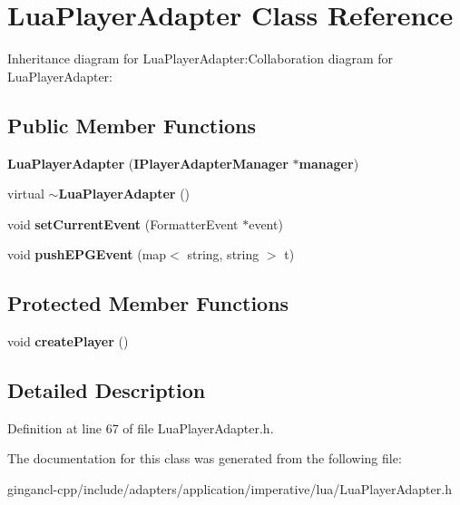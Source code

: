 \section{LuaPlayerAdapter Class Reference}
\label{classbr_1_1pucrio_1_1telemidia_1_1ginga_1_1ncl_1_1adapters_1_1application_1_1lua_1_1LuaPlayerAdapter}
Inheritance diagram for LuaPlayerAdapter:Collaboration diagram for LuaPlayerAdapter:\subsection*{Public Member Functions}
\begin{CompactItemize}
\item 
\textbf{LuaPlayerAdapter} ({\bf IPlayerAdapterManager} $\ast${\bf manager})\label{classbr_1_1pucrio_1_1telemidia_1_1ginga_1_1ncl_1_1adapters_1_1application_1_1lua_1_1LuaPlayerAdapter_b66133ab035f2930d5880e49c8e899be}

\item 
virtual {\bf $\sim$LuaPlayerAdapter} ()\label{classbr_1_1pucrio_1_1telemidia_1_1ginga_1_1ncl_1_1adapters_1_1application_1_1lua_1_1LuaPlayerAdapter_4409ff5306f97f5c9d3b182ad2763686}

\item 
void \textbf{setCurrentEvent} (FormatterEvent $\ast$event)\label{classbr_1_1pucrio_1_1telemidia_1_1ginga_1_1ncl_1_1adapters_1_1application_1_1lua_1_1LuaPlayerAdapter_de4aa1c8ab712eb3eef786af68214470}

\item 
void \textbf{pushEPGEvent} (map$<$ string, string $>$ t)\label{classbr_1_1pucrio_1_1telemidia_1_1ginga_1_1ncl_1_1adapters_1_1application_1_1lua_1_1LuaPlayerAdapter_34d14d8243c1405cc7c28a850a6dac6c}

\end{CompactItemize}
\subsection*{Protected Member Functions}
\begin{CompactItemize}
\item 
void \textbf{createPlayer} ()\label{classbr_1_1pucrio_1_1telemidia_1_1ginga_1_1ncl_1_1adapters_1_1application_1_1lua_1_1LuaPlayerAdapter_2fbb9533e3d66799b0a433c9298ea70f}

\end{CompactItemize}


\subsection{Detailed Description}




Definition at line 67 of file LuaPlayerAdapter.h.

The documentation for this class was generated from the following file:\begin{CompactItemize}
\item 
gingancl-cpp/include/adapters/application/imperative/lua/LuaPlayerAdapter.h\end{CompactItemize}
